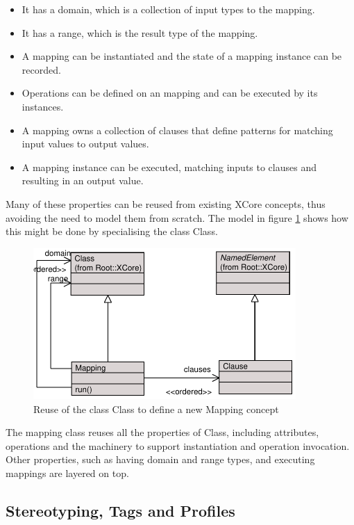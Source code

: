 \begin{itemize}
\item It has a domain, which is a collection of input types to the
mapping. \item It has a range, which is the result type of the
mapping. \item A mapping can be instantiated and the state of a
mapping instance can be recorded. \item Operations can be defined
on an mapping and can be executed by its instances. \item A
mapping owns a collection of clauses that define patterns for
matching input values to output values. \item A mapping instance
can be executed, matching inputs to clauses and resulting in an
output value.
\end{itemize}

Many of these properties can be reused from existing XCore
concepts, thus avoiding the need to model them from scratch. The
model in figure \ref{mappingspecialisation} shows how this might
be done by specialising the class Class.

\begin{figure}[htb]
\begin{center}
\includegraphics[width=10cm]{LanguageFamilies/figures/mappingspec}
\caption{Reuse of the class Class to define a new Mapping concept}
\label{mappingspecialisation}
\end{center}
\end{figure}

The mapping class reuses all the properties of Class, including
attributes, operations and the machinery to support instantiation
and operation invocation. Other properties, such as having domain
and range types, and executing mappings are layered on top.

\subsection{Stereotyping, Tags and Profiles}
\label{stereotypes}

